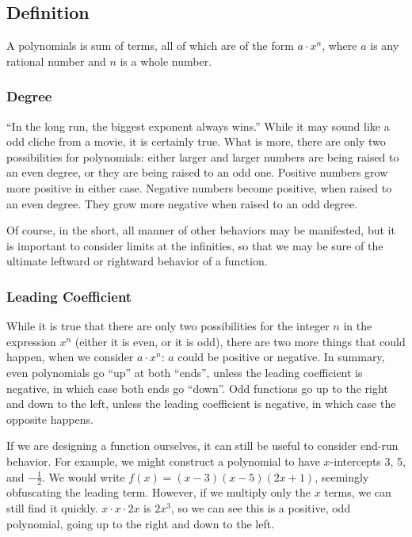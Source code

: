 
\subsection{Definition}



A polynomials is sum of terms, all of which are of the form $a\cdot{}x^n$, where $a$
is any rational number and $n$ is a whole number.

\subsubsection{Degree}
``In the long run, the biggest exponent always wins.''  While it may sound like a odd
cliche from a movie, it is certainly true.  What is more, there are only two possibilities
for polynomials: either larger and larger numbers are being raised to an even degree,
or they are being raised to an odd one.  Positive numbers grow more positive in either case.
Negative numbers become positive, when raised to an even degree.  They grow more
negative when raised to an odd degree.

Of course, in the short, all manner of other behaviors may be manifested, but it is 
important to consider limits at the infinities, so that we may be sure of the ultimate
leftward or rightward behavior of a function.

\subsubsection{Leading Coefficient}
While it is true that there are only two possibilities for the integer $n$ in the 
expression $x^n$ (either it is even, or it is odd), there are two more things that could 
happen, when we consider $a\cdot{}x^n$: $a$ could be positive or negative.
In summary, even polynomials go ``up'' at both ``ends'', unless the leading coefficient
is negative, in which case both ends go ``down''.  Odd functions go up to the right and
down to the left, unless the leading coefficient is negative, in which case the opposite
happens.

If we are designing a function ourselves, it can still be useful to consider
end-run behavior.  For example, we might construct a polynomial to have
$x$-intercepts 3, 5, and $-\frac{1}{2}$.  We would write $f(x)=(x-3)(x-5)(2x+1)$,
seemingly obfuscating the leading term.  However, if we multiply only the $x$ terms,
we can still find it quickly.  $x \cdot x \cdot 2x$ is $2x^3$, so we can see this is
a positive, odd polynomial, going up to the right and down to the left.

